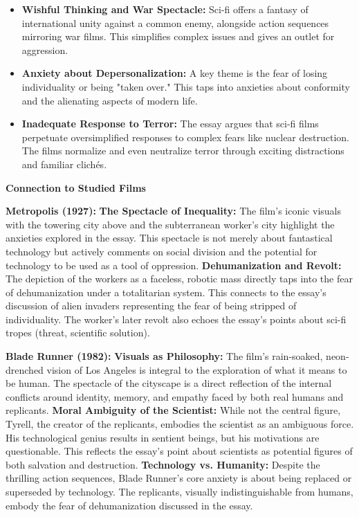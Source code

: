 \documentclass[11pt,fleqn]{book} %
\begin{document}
\begin{itemize}
\item \textbf{Wishful Thinking and War Spectacle:}  Sci-fi offers a fantasy of international unity against a common enemy, alongside action sequences mirroring war films. This simplifies complex issues and gives an outlet for aggression.

\item \textbf{Anxiety about Depersonalization:} A key theme is the fear of losing individuality or being "taken over."  This taps into anxieties about conformity and the alienating aspects of modern life. 

\item \textbf{Inadequate Response to Terror:} The essay argues that sci-fi films perpetuate oversimplified responses to complex fears like nuclear destruction. The films normalize and even neutralize terror through exciting distractions and familiar clichés.
\end{itemize}
\vspace{5pt}
\textbf{Connection to Studied Films}

 \textbf{Metropolis (1927):}
     \textbf{The Spectacle of Inequality:} The film's iconic visuals with the towering city above and the subterranean worker's city highlight the anxieties explored in the essay. This spectacle is not merely about fantastical technology but actively comments on social division and the potential for technology to be used as a tool of oppression.
     \textbf{Dehumanization and Revolt:} The depiction of the workers as a faceless, robotic mass directly taps into the fear of dehumanization under a totalitarian system. This connects to the essay's discussion of alien invaders representing the fear of being stripped of individuality. The worker's later revolt also echoes the essay's points about sci-fi tropes (threat, scientific solution). 

 \textbf{Blade Runner (1982):}
     \textbf{Visuals as Philosophy:} The film's rain-soaked, neon-drenched vision of Los Angeles is integral to the exploration of what it means to be human. The spectacle of the cityscape is a direct reflection of the internal conflicts around identity, memory, and empathy faced by both real humans and replicants.
     \textbf{Moral Ambiguity of the Scientist:} While not the central figure, Tyrell, the creator of the replicants, embodies the scientist as an ambiguous force. His technological genius results in sentient beings, but his motivations are questionable. This reflects the essay's point about scientists as potential figures of both salvation and destruction.
     \textbf{Technology vs. Humanity:}  Despite the thrilling action sequences, Blade Runner's core anxiety is about being replaced or superseded by technology.  The replicants, visually indistinguishable from humans, embody the fear of dehumanization discussed in the essay.
\end{document}
